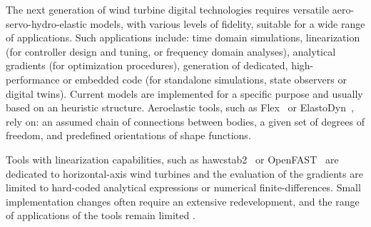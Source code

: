 \documentclass[wes, manuscript]{copernicus}
\renewcommand{\v}[1]{\boldsymbol{#1}}
\begin{document}


\introduction 

The next generation of wind turbine digital technologies requires versatile aero-servo-hydro-elastic
models, with various levels of fidelity, suitable for a wide range of applications. 
Such applications include: time domain simulations, linearization (for controller design and tuning, or frequency domain analyses), analytical gradients (for optimization procedures), generation of dedicated, high-performance or embedded code (for standalone simulations, state observers or digital twins). 
Current models are implemented for a specific purpose and usually based on an heuristic structure.
Aeroelastic tools, such as Flex~\citep{flexoye,branlard:2019flex} or ElastoDyn~\citep{OpenFAST}, rely on: an assumed chain of connections between bodies, a given set of degrees of freedom, and predefined orientations of shape functions. 


Tools with linearization capabilities, such as hawcstab2~\citep{Sonderby:2014} or OpenFAST~\citep{OpenFAST} are dedicated to horizontal-axis wind turbines and the evaluation of the gradients are limited to hard-coded analytical expressions or numerical finite-differences. 
Small implementation changes often require an extensive redevelopment, and the range of applications of the tools remain limited \citep{Simani:2015}.
\end{document}
